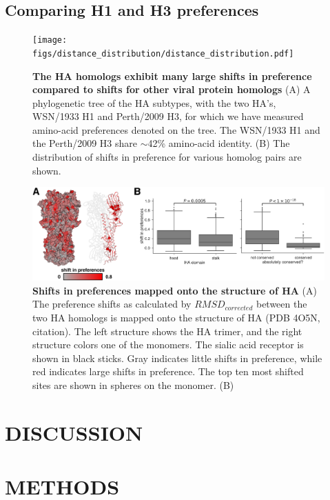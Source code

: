 \documentclass[11pt]{article}
\begin{document}
\subsection*{Comparing H1 and H3 preferences}

\begin{figure}
\centerline{\texttt{[image: figs/distance\_distribution/distance\_distribution.pdf]}}
\caption{\label{fig:distance_distribution}
{\bf The HA homologs exhibit many large shifts in preference compared to shifts for other viral protein homologs}
(A) A phylogenetic tree of the HA subtypes, with the two HA's, WSN/1933 H1 and Perth/2009 H3, for which we have measured amino-acid preferences denoted on the tree. 
The WSN/1933 H1 and the Perth/2009 H3 share $\sim$42\% amino-acid identity.
(B) The distribution of shifts in preference for various homolog pairs are shown.
}
\end{figure}

\begin{figure}
\centerline{\includegraphics[width=\textwidth]{figs/RMSD_heatmap/RMSD_heatmap.pdf}}
\caption{\label{fig:RMSD_heatmap}
{\bf Shifts in preferences mapped onto the structure of HA}
(A) The preference shifts as calculated by $RMSD_{corrected}$ between the two HA homologs is mapped onto the structure of HA (PDB 4O5N, citation). 
The left structure shows the HA trimer, and the right structure colors one of the monomers. 
The sialic acid receptor is shown in black sticks.
Gray indicates little shifts in preference, while red indicates large shifts in preference.
The top ten most shifted sites are shown in spheres on the monomer.
(B)
}
\end{figure}


\section*{DISCUSSION}


\clearpage
\small

\section*{METHODS}
\label{sec:methods}
\end{document}
